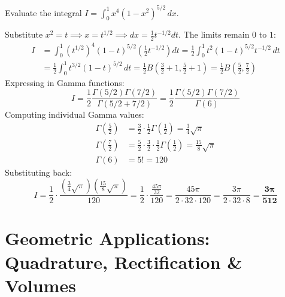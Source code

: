 \begin{example}
Evaluate the integral $I = \int_0^1 x^4 (1 - x^2)^{5/2}\,dx$.
\end{example}

\begin{solutionbox}
Substitute $x^2 = t \implies x = t^{1/2} \implies dx = \frac{1}{2} t^{-1/2} dt$. The limits remain $0$ to $1$:
\begin{align*}
    I &= \int_0^1 (t^{1/2})^4 (1 - t)^{5/2} \left(\frac{1}{2} t^{-1/2}\right) dt = \frac{1}{2} \int_0^1 t^2 (1 - t)^{5/2} t^{-1/2}\,dt \\
    &= \frac{1}{2} \int_0^1 t^{3/2} (1 - t)^{5/2}\,dt = \frac{1}{2} B\left(\frac{3}{2}+1, \frac{5}{2}+1\right) = \frac{1}{2} B\left(\frac{5}{2}, \frac{7}{2}\right)
\end{align*}
Expressing in Gamma functions:
\begin{equation*}
    I = \frac{1}{2} \frac{\Gamma(5/2)\Gamma(7/2)}{\Gamma(5/2 + 7/2)} = \frac{1}{2} \frac{\Gamma(5/2)\Gamma(7/2)}{\Gamma(6)}
\end{equation*}
Computing individual Gamma values:
\begin{align*}
    \Gamma\left(\frac{5}{2}\right) &= \frac{3}{2} \cdot \frac{1}{2} \Gamma\left(\frac{1}{2}\right) = \frac{3}{4}\sqrt{\pi} \\
    \Gamma\left(\frac{7}{2}\right) &= \frac{5}{2} \cdot \frac{3}{2} \cdot \frac{1}{2} \Gamma\left(\frac{1}{2}\right) = \frac{15}{8}\sqrt{\pi} \\
    \Gamma(6) &= 5! = 120
\end{align*}
Substituting back:
\begin{equation*}
    I = \frac{1}{2} \cdot \frac{\left(\frac{3}{4}\sqrt{\pi}\right)\left(\frac{15}{8}\sqrt{\pi}\right)}{120} = \frac{1}{2} \cdot \frac{\frac{45\pi}{32}}{120} = \frac{45\pi}{2 \cdot 32 \cdot 120} = \frac{3\pi}{2 \cdot 32 \cdot 8} = \mathbf{\frac{3\pi}{512}}
\end{equation*}
\end{solutionbox}

\section{Geometric Applications: Quadrature, Rectification \& Volumes}

